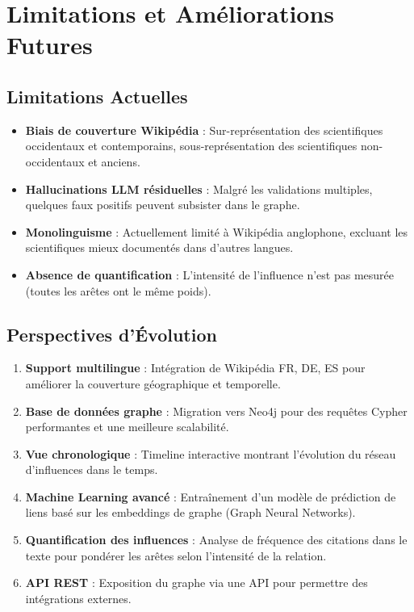 \documentclass[12pt,a4paper]{report}
\begin{document}
\section{Limitations et Améliorations Futures}

\subsection{Limitations Actuelles}

\begin{itemize}
    \item \textbf{Biais de couverture Wikipédia} : Sur-représentation des scientifiques occidentaux et contemporains, sous-représentation des scientifiques non-occidentaux et anciens.
    \item \textbf{Hallucinations LLM résiduelles} : Malgré les validations multiples, quelques faux positifs peuvent subsister dans le graphe.
    \item \textbf{Monolinguisme} : Actuellement limité à Wikipédia anglophone, excluant les scientifiques mieux documentés dans d'autres langues.
    \item \textbf{Absence de quantification} : L'intensité de l'influence n'est pas mesurée (toutes les arêtes ont le même poids).
\end{itemize}

\subsection{Perspectives d'Évolution}

\begin{enumerate}
    \item \textbf{Support multilingue} : Intégration de Wikipédia FR, DE, ES pour améliorer la couverture géographique et temporelle.

    \item \textbf{Base de données graphe} : Migration vers Neo4j pour des requêtes Cypher performantes et une meilleure scalabilité.

    \item \textbf{Vue chronologique} : Timeline interactive montrant l'évolution du réseau d'influences dans le temps.

    \item \textbf{Machine Learning avancé} : Entraînement d'un modèle de prédiction de liens basé sur les embeddings de graphe (Graph Neural Networks).

    \item \textbf{Quantification des influences} : Analyse de fréquence des citations dans le texte pour pondérer les arêtes selon l'intensité de la relation.

    \item \textbf{API REST} : Exposition du graphe via une API pour permettre des intégrations externes.
\end{enumerate}
\end{document}
